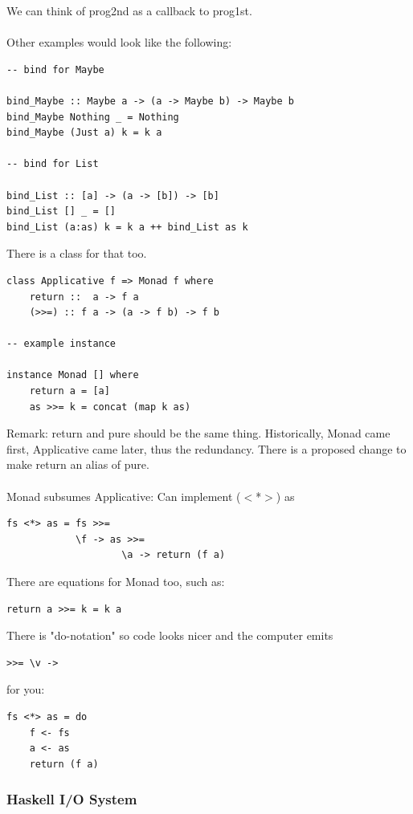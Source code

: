 \documentclass[12pt]{article}
\begin{document}
We can think of prog2nd as a callback to prog1st.\\
\\
Other examples would look like the following:

\begin{lstlisting}
-- bind for Maybe

bind_Maybe :: Maybe a -> (a -> Maybe b) -> Maybe b
bind_Maybe Nothing _ = Nothing
bind_Maybe (Just a) k = k a

-- bind for List

bind_List :: [a] -> (a -> [b]) -> [b]
bind_List [] _ = []
bind_List (a:as) k = k a ++ bind_List as k
\end{lstlisting}

There is a class for that too.
\begin{lstlisting}
class Applicative f => Monad f where
	return ::  a -> f a
	(>>=) :: f a -> (a -> f b) -> f b
	
-- example instance

instance Monad [] where
	return a = [a]
	as >>= k = concat (map k as)
\end{lstlisting}

Remark: return and pure should be the same thing. Historically, Monad came first, Applicative came later, thus the redundancy. There is a proposed change to make return an alias of pure.\\
\\
Monad subsumes Applicative: Can implement ($<$*$>$) as

\begin{lstlisting}
fs <*> as = fs >>=
			\f -> as >>=
					\a -> return (f a)
\end{lstlisting}

There are equations for Monad too, such as:
\begin{lstlisting}
return a >>= k = k a
\end{lstlisting}

There is "do-notation" so code looks nicer and the computer emits
\begin{lstlisting}
>>= \v ->
\end{lstlisting}
for you:
\begin{lstlisting}
fs <*> as = do
	f <- fs
	a <- as
	return (f a)
\end{lstlisting}

\subsubsection{Haskell I\slash O System}
\end{document}
